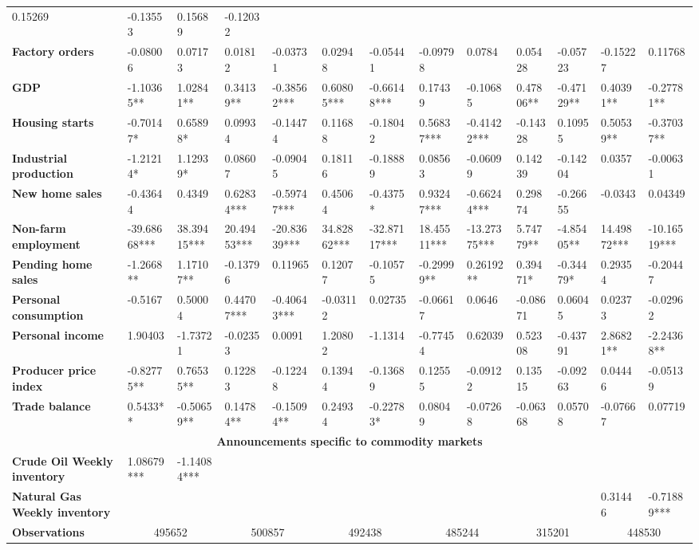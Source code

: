 \begin{sidewaystable}
{\begin{tabular}{@{}lllllllllllll@{}}
0.15269 & -0.13553 & 0.15689 & -0.12032 \\ \textbf{Factory orders}& -0.08006 & 0.07173 & 0.01812 & -0.03731 & 0.02948 & -0.05441 & -0.09798 & 0.0784 & 0.05428 & -0.05723 & -0.15227 & 0.11768 \\ \textbf{GDP}& -1.10365** & 1.02841** & 0.34139** & -0.38562*** & 0.60805*** & -0.66148*** & 0.17439 & -0.10685 & 0.47806** & -0.47129** & 0.40391** & -0.27781** \\ \textbf{Housing starts}& -0.70147* & 0.65898* & 0.09934 & -0.14474 & 0.11688 & -0.18042 & 0.56837*** & -0.41422*** & -0.14328 & 0.10955 & 0.50539** & -0.37037** \\ \textbf{Industrial production}& -1.21214* & 1.12939* & 0.08607 & -0.09045 & 0.18116 & -0.18889 & 0.08563 & -0.06099 & 0.14239 & -0.14204 & 0.0357 & -0.00631 \\ \textbf{New home sales}& -0.43644 & 0.4349 & 0.62834*** & -0.59747*** & 0.45064 & -0.4375* & 0.93247*** & -0.66244*** & 0.29874 & -0.26655 & -0.0343 & 0.04349 \\ \textbf{Non-farm employment}& -39.68668*** & 38.39415*** & 20.49453*** & -20.83639*** & 34.82862*** & -32.87117*** & 18.45511*** & -13.27375*** & 5.74779** & -4.85405** & 14.49872*** & -10.16519*** \\ \textbf{Pending home sales}& -1.2668** & 1.17107** & -0.13796 & 0.11965 & 0.12077 & -0.10575 & -0.29999** & 0.26192** & 0.39471* & -0.34479* & 0.29354 & -0.20447 \\ \textbf{Personal consumption}& -0.5167 & 0.50004 & 0.44707*** & -0.40643*** & -0.03112 & 0.02735 & -0.06617 & 0.0646 & -0.08671 & 0.06045 & 0.02373 & -0.02962 \\ \textbf{Personal income}& 1.90403 & -1.73721 & -0.02353 & 0.0091 & 1.20802 & -1.1314 & -0.77454 & 0.62039 & 0.52308 & -0.43791 & 2.86821** & -2.24368** \\ \textbf{Producer price index}& -0.82775** & 0.76535** & 0.12283 & -0.12248 & 0.13944 & -0.13689 & 0.12555 & -0.09122 & 0.13515 & -0.09263 & 0.04446 & -0.05139 \\ \textbf{Trade balance}& 0.5433** & -0.50659** & 0.14784** & -0.15094** & 0.24934 & -0.22783* & 0.08049 & -0.07268 & -0.06368 & 0.05708 & -0.07667 & 0.07719 \\  \midrule \multicolumn{13}{c}{\textbf{Announcements specific to commodity markets}} \\ \midrule \textbf{Crude Oil Weekly inventory}& 1.08679*** & -1.14084*** &  &  &  &  &  &  &  &  &  &  \\ \textbf{Natural Gas Weekly inventory}&  &  &  &  &  &  &  &  &  &  & 0.31446 & -0.71889*** \\  \midrule \textbf{Observations}             &\multicolumn{2}{c}{ 495652 }                                                 & \multicolumn{2}{c}{ 500857 }                                                 & \multicolumn{2}{c}{ 492438 }                                                 & \multicolumn{2}{c}{ 485244 }                                                 & \multicolumn{2}{c}{ 315201 }                                                   & \multicolumn{2}{c}{ 448530 }                         
\end{tabular}}
\end{sidewaystable}
